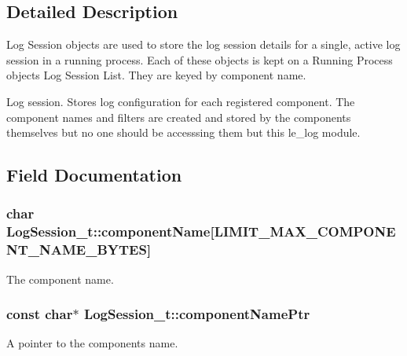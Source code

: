 \subsection{Detailed Description}
Log Session objects are used to store the log session details for a single, active log session in a running process. Each of these objects is kept on a Running Process object\textquotesingle{}s Log Session List. They are keyed by component name.

Log session. Stores log configuration for each registered component. The component names and filters are created and stored by the components\textquotesingle{} themselves but no one should be accesssing them but this le\+\_\+log module. 

\subsection{Field Documentation}
\subsubsection[{\texorpdfstring{component\+Name}{componentName}}]{\setlength{\rightskip}{0pt plus 5cm}char Log\+Session\+\_\+t\+::component\+Name\mbox{[}{\bf L\+I\+M\+I\+T\+\_\+\+M\+A\+X\+\_\+\+C\+O\+M\+P\+O\+N\+E\+N\+T\+\_\+\+N\+A\+M\+E\+\_\+\+B\+Y\+T\+ES}\mbox{]}}\hypertarget{struct_log_session__t_a72d98b5d736a71c7ac67393f8a3236fb}{}\label{struct_log_session__t_a72d98b5d736a71c7ac67393f8a3236fb}


The component name. 

\subsubsection[{\texorpdfstring{component\+Name\+Ptr}{componentNamePtr}}]{\setlength{\rightskip}{0pt plus 5cm}const char$\ast$ Log\+Session\+\_\+t\+::component\+Name\+Ptr}\hypertarget{struct_log_session__t_a120969e6c78dc817a06304fcde2da15e}{}\label{struct_log_session__t_a120969e6c78dc817a06304fcde2da15e}


A pointer to the component\textquotesingle{}s name. 

